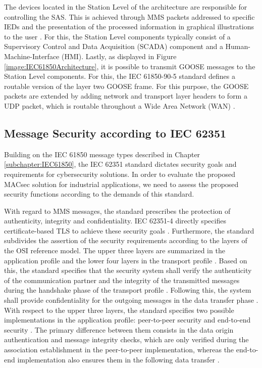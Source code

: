 \documentclass[conference, onecolumn, a4paper]{IEEEtran}
\begin{document}
\smallskip
The devices located in the Station Level of the architecture are responsible for controlling the SAS. This is achieved through MMS packets addressed 
to specific IEDs and the presentation of the processed information in graphical illustrations to the user \cite{SGRWin_IEC61850Architecture:2021}. 
For this, the Station Level components typically consist of a Supervisory Control and Data Acquisition (SCADA) component and a Human-Machine-Interface 
(HMI). Lastly, as displayed in Figure \ref{image:IEC61850Architecture}, it is possible to transmit GOOSE messages to the Station Level components. 
For this, the IEC 61850-90-5 standard \cite{IEC61850-90-5:2012} defines a routable version of the layer two GOOSE frame. For this purpose, the GOOSE 
packets are extended by adding network and transport layer headers to form a UDP packet, which is routable throughout a Wide Area Network (WAN) 
\cite{routable_GOOSE_SV:2020}.

\subsection{Message Security according to IEC 62351}
\noindent Building on the IEC 61850 message types described in Chapter \ref{subchapter:IEC61850}, the IEC 62351 standard \cite{IEC62351:2024} dictates 
security goals and requirements for cybersecurity solutions. In order to evaluate the proposed MACsec solution for industrial applications, 
we need to assess the proposed security functions according to the demands of this standard.

\smallskip
With regard to MMS messages, the standard prescribes the protection of authenticity, integrity and confidentiality. IEC 62351-4 directly specifies 
certificate-based TLS to achieve these security goals \cite{SecureMMS:2020}. Furthermore, the standard subdivides the assertion of the security requirements 
according to the layers of the OSI reference model. The upper three layers are summarized in the application profile and the lower four layers in the 
transport profile \cite{SecureMMS:2020}. Based on this, the standard specifies that the security system shall verify the authenticity of the communication 
partner and the integrity of the transmitted messages during the handshake phase of the transport profile \cite{Review_IEC62351:2019}. Following this, the 
system shall provide confidentiality for the outgoing messages in the data transfer phase \cite{SecureMMS:2020}. With respect to the upper three layers, the 
standard specifies two possible implementations in the application profile: peer-to-peer security and end-to-end security \cite{Review_IEC62351:2019}. The 
primary difference between them consists in the data origin authentication and message integrity checks, which are only verified during the association 
establishment in the peer-to-peer implementation, whereas the end-to-end implementation also ensures them in the following data transfer \cite{Review_IEC62351:2019}.
\end{document}
